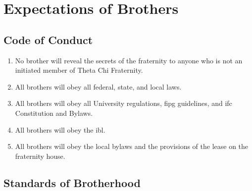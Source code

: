 \chapter{Expectations of Brothers}
\label{expectations-bhood}

\section{Code of Conduct}
	\begin{enumerate}
		\item No brother will reveal the secrets of the fraternity to anyone who is not an initiated member of Theta Chi Fraternity.
		\item All brothers will obey all federal, state, and local laws.
		\item All brothers will obey all University regulations, \gls{fipg} guidelines, and \gls{ifc} Constitution and Bylaws.
		\item All brothers will obey the \gls{ibl}.
		\item All brothers will obey the local bylaws and the provisions of the lease on the fraternity house.

	\end{enumerate}

\section{Standards of Brotherhood}
	
